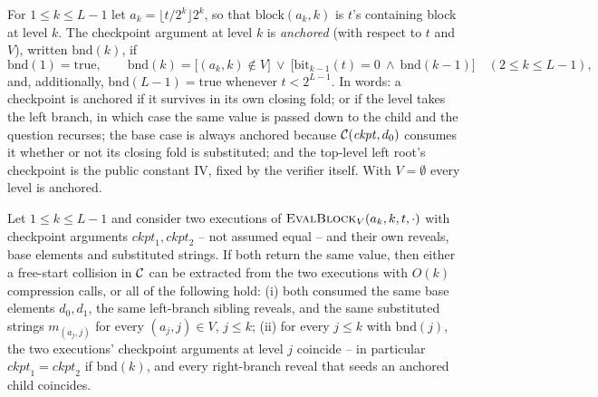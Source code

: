 \begin{definition}
\label{def:anchored}
For $1 \le k \le L-1$ let $a_k = \lfloor t/2^k \rfloor 2^k$, so that
$\mathrm{block}(a_k,k)$ is $t$'s containing block at level $k$. The
checkpoint argument at level $k$ is \emph{anchored} (with respect to $t$
and $V$), written $\mathrm{bnd}(k)$, if
\[
\mathrm{bnd}(1) = \text{true}, \qquad
\mathrm{bnd}(k) = \big[(a_k,k) \notin V\big] \ \vee\
\big[\mathrm{bit}_{k-1}(t) = 0 \ \wedge\ \mathrm{bnd}(k-1)\big]
\quad (2 \le k \le L-1),
\]
and, additionally, $\mathrm{bnd}(L-1) = \text{true}$ whenever $t < 2^{L-1}$.
In words: a checkpoint is anchored if it survives in its own closing fold;
or if the level takes the left branch, in which case the same value is
passed down to the child and the question recurses; the base case is
always anchored because $\mathcal{C}(\mathit{ckpt}, d_0)$ consumes it whether or not
its closing fold is substituted; and the top-level left root's checkpoint
is the public constant $\mathrm{IV}$, fixed by the verifier itself. With
$V = \emptyset$ every level is anchored.
\end{definition}

\begin{lemma}[Extraction]
\label{lem:extraction}
Let $1 \le k \le L-1$ and consider two executions of
$\textsc{EvalBlock}_V(a_k, k, t, \cdot)$ with checkpoint arguments
$\mathit{ckpt}_1, \mathit{ckpt}_2$ -- not assumed equal -- and their own
reveals, base elements and substituted strings. If both return the same
value, then either a free-start collision in $\mathcal{C}$ can be extracted from the
two executions with $O(k)$ compression calls, or all of the following
hold: (i) both consumed the same base elements $d_0, d_1$, the same
left-branch sibling reveals, and the same substituted strings
$m_{(a_j,j)}$ for every $(a_j,j) \in V$, $j \le k$; (ii) for every $j \le
k$ with $\mathrm{bnd}(j)$, the two executions' checkpoint arguments at
level $j$ coincide -- in particular $\mathit{ckpt}_1 = \mathit{ckpt}_2$ if
$\mathrm{bnd}(k)$, and every right-branch reveal that seeds an anchored
child coincides.
\end{lemma}

